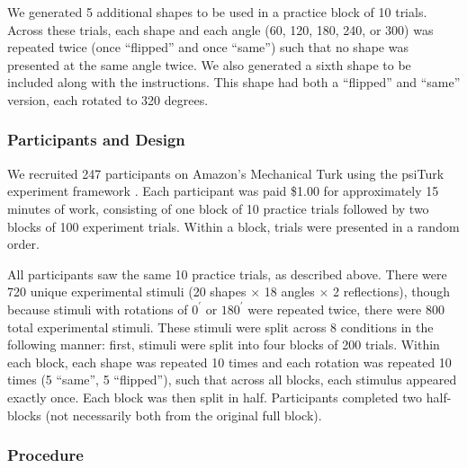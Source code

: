 \documentclass[10pt,letterpaper]{article}
\begin{document}
We generated 5 additional shapes to be used in a practice block of 10
trials. Across these trials, each shape and each angle (60, 120, 180,
240, or 300) was repeated twice (once ``flipped'' and once ``same'')
such that no shape was presented at the same angle twice. We also
generated a sixth shape to be included along with the instructions.
This shape had both a ``flipped'' and ``same'' version, each rotated
to 320 degrees.


\subsubsection{Participants and Design}

We recruited 247 participants on Amazon's Mechanical Turk using the
psiTurk experiment framework \cite{Mcdonnell12}. Each participant was
paid \$1.00 for approximately 15 minutes of work, consisting of one
block of 10 practice trials followed by two blocks of 100 experiment
trials. Within a block, trials were presented in a random order.

All participants saw the same 10 practice trials, as described
above. There were 720 unique experimental stimuli (20 shapes $\times$
18 angles $\times$ 2 reflections), though because stimuli with
rotations of $0^\prime$ or $180^\prime$ were repeated twice, there
were 800 total experimental stimuli. These stimuli were split across 8
conditions in the following manner: first, stimuli were split into
four blocks of 200 trials. Within each block, each shape was repeated
10 times and each rotation was repeated 10 times (5 ``same'', 5
``flipped''), such that across all blocks, each stimulus appeared
exactly once. Each block was then split in half. Participants
completed two half-blocks (not necessarily both from the original full
block).

\subsubsection{Procedure}
\end{document}
